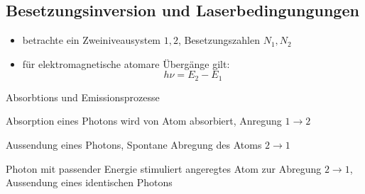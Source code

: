 \documentclass[10pt, aspectratio=169]{beamer}
\begin{document}
\subsection{Besetzungsinversion und Laserbedingungungen}
\begin{frame}
  \begin{itemize}
  \item betrachte ein Zweiniveausystem \(1,2\), Besetzungszahlen
    \(N_1, N_2\)
  \item f\"ur elektromagnetische atomare \"Uberg\"ange gilt:
    \begin{equation}
      h\nu = E_2 - E_1
    \end{equation}
  \end{itemize}
  \pause
  \begin{block}{Absorbtions und Emissionsprozesse}
    \begin{description}
    \item<2->[Absorption] Absorption eines Photons wird von Atom
      absorbiert, Anregung \(1\rightarrow 2\)
    \item<3->[Spontane Emission] Aussendung eines Photons, Spontane
      Abregung des Atoms \(2\rightarrow 1\)

    \item<4->[Stimulierte Emission] Photon mit passender
      Energie stimuliert angeregtes
      Atom zur Abregung \(2\rightarrow 1\), Aussendung eines identischen
      Photons
    \end{description}
  \end{block}
\end{frame}
\end{document}
